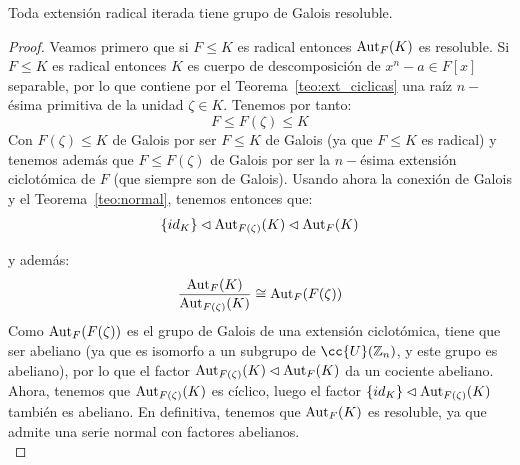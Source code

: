 \begin{lema}
    Toda extensión radical iterada tiene grupo de Galois resoluble.
    \begin{proof} 
        Veamos primero que si $F\leq K$ es radical entonces $\operatorname{Aut}_F(K)$ es resoluble. Si $F\leq K$ es radical entonces $K$ es cuerpo de descomposición de $x^n-a\in F[x]$ separable, por lo que contiene por el Teorema~\ref{teo:ext_ciclicas} una raíz $n-$ésima primitiva de la unidad $\zeta\in K$. Tenemos por tanto:
        \begin{equation*}
            F\leq F(\zeta) \leq K
        \end{equation*}
        Con $F(\zeta)\leq K$ de Galois por ser $F\leq K$ de Galois (ya que $F\leq K$ es radical) y tenemos además que $F\leq F(\zeta)$ de Galois por ser la $n-$ésima extensión ciclotómica de $F$ (que siempre son de Galois). Usando ahora la conexión de Galois y el Teorema~\ref{teo:normal}, tenemos entonces que:
        \begin{equation*}
            \{id_K\} \lhd \operatorname{Aut}_{F(\zeta)}(K) \lhd \operatorname{Aut}_F(K)
        \end{equation*}

        y además:
        \begin{equation*}
            \frac{\operatorname{Aut}_F(K)}{\operatorname{Aut}_{F(\zeta)}(K)} \cong \operatorname{Aut}_F(F(\zeta))
        \end{equation*}
        Como $\operatorname{Aut}_F(F(\zeta))$ es el grupo de Galois de una extensión ciclotómica, tiene que ser abeliano (ya que es isomorfo a un subgrupo de $\cc{U}(\mathbb{Z}_n)$, y este grupo es abeliano), por lo que el factor $\operatorname{Aut}_{F(\zeta)}(K)\lhd \operatorname{Aut}_F(K)$ da un cociente abeliano. Ahora, tenemos que $\operatorname{Aut}_{F(\zeta)}(K)$ es cíclico, luego el factor $\{id_K\} \lhd \operatorname{Aut}_{F(\zeta)}(K)$ también es abeliano. En definitiva, tenemos que $\operatorname{Aut}_F(K)$ es resoluble, ya que admite una serie normal con factores abelianos.\\


\end{proof}
\end{lema}
